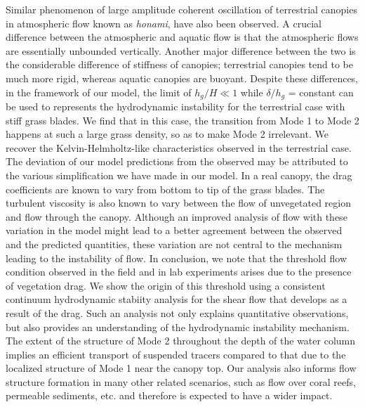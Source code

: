 \documentclass[aps,prl,twocolumn,superscriptaddress,10pt]{revtex4-1}  %
\newcommand{\hg}{h_g}
\begin{document}
Similar phenomenon of large amplitude coherent oscillation of terrestrial canopies in atmospheric flow known as \textit{honami}\cite{Inoue56,Raupach96}, have also been observed.
A crucial difference between the atmospheric and aquatic flow is that the atmospheric flows are essentially unbounded vertically\cite{Vivoni98,Nepf00}. 
Another major difference between the two is the considerable difference of stiffness of canopies; terrestrial canopies tend to be much more rigid, whereas aquatic canopies are buoyant\cite{Vivoni98,Ghisal02}. 
Despite these differences, in the framework of our model, the limit of $\hg/H \ll 1$ while $\delta/\hg$ = constant can be used to represents the hydrodynamic instability for the terrestrial case with stiff grass blades. We find that in this case, the transition from Mode 1 to Mode 2 happens at such a large grass density, so as to make Mode 2 irrelevant. We recover the Kelvin-Helmholtz-like characteristics observed in the terrestrial case. 
\newline
The deviation of our model predictions from the observed may be attributed to the various simplification we have made in our model. 
In a real canopy, the drag coefficients are known to vary from bottom to tip of the grass blades\cite{Vivoni98,Nepf00}. 
The turbulent viscosity is also known to vary between the flow of unvegetated region and flow through the canopy\cite{Ghisal02}. 
Although an improved analysis of flow with these variation in the model might lead to a better agreement between the observed and the predicted quantities, these variation are not central to the mechanism leading to the instability of flow.
\newline
In conclusion, we note that the threshold flow condition observed in the field and in lab experiments arises due to the presence of vegetation drag. 
We show the origin of this threshold using a consistent continuum hydrodynamic stabiity analysis for the shear flow that develops as a result of the drag. 
Such an analysis not only explains quantitative observations, but also provides an understanding of the hydrodynamic instability mechanism. 
The extent of the structure of Mode 2 throughout the depth of the water column implies an efficient transport of suspended tracers compared to that due to the localized structure of Mode 1 near the canopy top. 
Our analysis also informs flow structure formation in many other related scenarios, such as flow over coral reefs, permeable sediments, etc. and therefore is expected to have a wider impact.

{}

\end{document}
